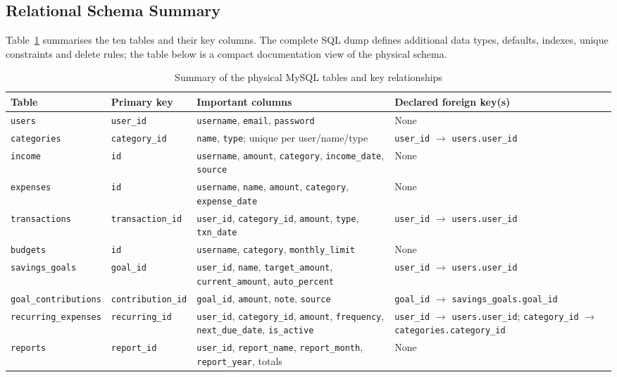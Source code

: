 \documentclass{tietreport}
\begin{document}
\subsection{Relational Schema Summary}

Table~\ref{tab:dbschema} summarises the ten tables and their key columns.
The complete SQL dump defines additional data types, defaults, indexes,
unique constraints and delete rules; the table below is a compact
documentation view of the physical schema.

\begin{table}[htbp]
\centering
\scriptsize
\begin{tabularx}{\textwidth}{|p{2.5cm}|p{2.5cm}|X|p{3.0cm}|}
\hline
\textbf{Table} & \textbf{Primary key} & \textbf{Important columns} & \textbf{Declared foreign key(s)}\\
\hline
\texttt{users} & \texttt{user\_id} & \texttt{username}, \texttt{email}, \texttt{password} & None\\
\hline
\texttt{categories} & \texttt{category\_id} & \texttt{name}, \texttt{type}; unique per user/name/type & \texttt{user\_id} $\rightarrow$ \texttt{users.user\_id}\\
\hline
\texttt{income} & \texttt{id} & \texttt{username}, \texttt{amount}, \texttt{category}, \texttt{income\_date}, \texttt{source} & None\\
\hline
\texttt{expenses} & \texttt{id} & \texttt{username}, \texttt{name}, \texttt{amount}, \texttt{category}, \texttt{expense\_date} & None\\
\hline
\texttt{transactions} & \texttt{transaction\_id} & \texttt{user\_id}, \texttt{category\_id}, \texttt{amount}, \texttt{type}, \texttt{txn\_date} & \texttt{user\_id} $\rightarrow$ \texttt{users.user\_id}\\
\hline
\texttt{budgets} & \texttt{id} & \texttt{username}, \texttt{category}, \texttt{monthly\_limit} & None\\
\hline
\texttt{savings\_goals} & \texttt{goal\_id} & \texttt{user\_id}, \texttt{name}, \texttt{target\_amount}, \texttt{current\_amount}, \texttt{auto\_percent} & \texttt{user\_id} $\rightarrow$ \texttt{users.user\_id}\\
\hline
\texttt{goal\_contributions} & \texttt{contribution\_id} & \texttt{goal\_id}, \texttt{amount}, \texttt{note}, \texttt{source} & \texttt{goal\_id} $\rightarrow$ \texttt{savings\_goals.goal\_id}\\
\hline
\texttt{recurring\_expenses} & \texttt{recurring\_id} & \texttt{user\_id}, \texttt{category\_id}, \texttt{amount}, \texttt{frequency}, \texttt{next\_due\_date}, \texttt{is\_active} & \texttt{user\_id} $\rightarrow$ \texttt{users.user\_id}; \texttt{category\_id} $\rightarrow$ \texttt{categories.category\_id}\\
\hline
\texttt{reports} & \texttt{report\_id} & \texttt{user\_id}, \texttt{report\_name}, \texttt{report\_month}, \texttt{report\_year}, totals & None\\
\hline
\end{tabularx}
\caption{Summary of the physical MySQL tables and key relationships}
\label{tab:dbschema}
\end{table}
\end{document}
